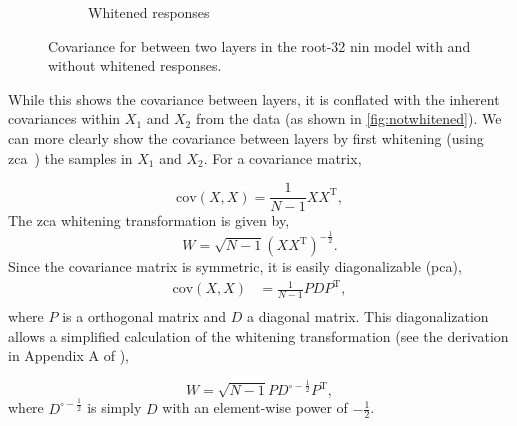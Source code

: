 \documentclass[thesis]{subfiles}
\begin{document}
\begin{figure}[tbp]
\begin{subfigure}[b]{0.3\textheight}
			\caption{Whitened responses}
			\label{fig:whitened}
		\end{subfigure}
		\caption[Inter-layer covariance with/without whitened responses]{Covariance for between two layers in the root-32 \gls{nin} model with and without whitened responses.}
		\label{fig:whitevsnot}
	\end{figure}
	
	While this shows the covariance between layers, it is conflated with the inherent covariances within $X_1$ and $X_2$ from the data (as shown in \cref{fig:notwhitened}). We can more clearly show the covariance between layers by first whitening (using \gls{zca}~\citep{CIFAR10}) the samples in $X_1$ and $X_2$. For a covariance matrix,
	
	\begin{equation}
	\textrm{cov}(X, X) = \frac{1}{N-1} XX^\textrm{T},
	\end{equation}
	The \gls{zca} whitening transformation is given by,
	\begin{equation}
	W = \sqrt{N-1}\left(XX^\textrm{T}\right)^{-\frac{1}{2}}.
	\end{equation}
	Since the covariance matrix is symmetric, it is easily diagonalizable (\ie \gls{pca}),
	\begin{align}
	\textrm{cov}(X, X) &= \frac{1}{N-1} PDP^\textrm{T},\\
	\end{align}
	where $P$ is a orthogonal matrix and $D$ a diagonal matrix. This diagonalization allows a simplified calculation of the whitening transformation (see the derivation in Appendix A of \citet{CIFAR10}),
	
	\begin{equation}
	W = \sqrt{N-1}PD^{\circ-\frac{1}{2}}P^\textrm{T},
	\end{equation}
	where $D^{\circ-\frac{1}{2}}$ is simply $D$ with an element-wise power of $-\frac{1}{2}$.
	
\end{document}

